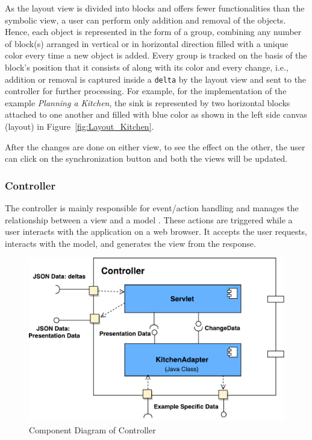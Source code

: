 As the layout view is divided into blocks and offers fewer functionalities than the symbolic view, a user can perform only addition and removal of the objects. Hence, each object is represented in the form of a group, combining any number of block(s) arranged in vertical or in horizontal direction filled with a unique color every time a new object is added. Every group is tracked on the basis of the block's position that it consists of along with its color and every change, i.e., addition or removal is captured inside a \texttt{delta} by the layout view and sent to the controller for further processing. For example, for the implementation of the example \textit{Planning a Kitchen}, the sink is represented by two horizontal blocks attached to one another and filled with {\color{blue} blue} color as shown in the left side canvas (layout) in Figure~\ref{fig:Layout_Kitchen}. 

After the changes are done on either view, to see the effect on the other, the user can click on the synchronization button and both the views will be updated.
 
\subsubsection{Controller}\label{subsubsec:design_controller}
The controller is mainly responsible for event/action handling and manages the relationship between a view and a model \cite{mdd-webwithmvc}. These actions are triggered while a user interacts with the application on a web browser. It accepts the user requests, interacts with the model, and generates the view from the response.

\begin{figure}[h]
	\includegraphics[width=1\textwidth]{figures/Component_Diagram-Controller}
	\caption{Component Diagram of Controller}
	\label{fig:Component_Diagram-Controller}
\end{figure}

